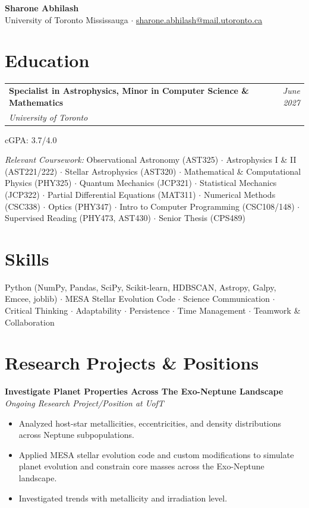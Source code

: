 \documentclass[11pt, letterpaper]{article}
\makeatletter
\newcommand{\cveducation}[3]{%
  \noindent
  \begin{tabular*}{\textwidth}{@{}l@{\extracolsep{\fill}}r@{}}
    \textbf{#1} & \textit{\small #3} \\
    \textit{#2} & 
  \end{tabular*}%
  \par\vspace{2pt}%
}
\makeatother
\begin{document}
\begin{center}
  {\LARGE\bfseries\color{accent} Sharone Abhilash}\\[4pt]
  {\small
    University of Toronto Mississauga $\cdot$
    \href{}{sharone.abhilash@mail.utoronto.ca}
  }
\end{center}

\vspace{4pt}

\section{Education}

\cveducation{Specialist in Astrophysics, Minor in Computer Science \& Mathematics}{University of Toronto}{June 2027}

\noindent cGPA: 3.7/4.0

\textit{Relevant Coursework:}
Observational Astronomy (AST325) $\cdot$
Astrophysics I \& II (AST221/222) $\cdot$
Stellar Astrophysics (AST320) $\cdot$
Mathematical \& Computational Physics (PHY325) $\cdot$
Quantum Mechanics (JCP321) $\cdot$
Statistical Mechanics (JCP322) $\cdot$
Partial Differential Equations (MAT311) $\cdot$
Numerical Methods (CSC338) $\cdot$
Optics (PHY347) $\cdot$
Intro to Computer Programming (CSC108/148) $\cdot$
Supervised Reading (PHY473, AST430) $\cdot$
Senior Thesis (CPS489)


\section{Skills}

Python (NumPy, Pandas, SciPy, Scikit-learn, HDBSCAN, Astropy, Galpy, Emcee, joblib) $\cdot$
MESA Stellar Evolution Code $\cdot$
Science Communication $\cdot$
Critical Thinking $\cdot$
Adaptability $\cdot$
Persistence $\cdot$
Time Management $\cdot$
Teamwork \& Collaboration

\section{Research Projects \& Positions}

\noindent\textbf{Investigate Planet Properties Across The Exo-Neptune Landscape}\\
\textit{Ongoing Research Project/Position at UofT}
\begin{itemize}
  \item Analyzed host-star metallicities, eccentricities, and density distributions across Neptune subpopulations.
  \item Applied MESA stellar evolution code and custom modifications to simulate planet evolution and constrain core masses across the Exo-Neptune landscape.
  \item Investigated trends with metallicity and irradiation level.
\end{itemize}
 
\end{document}
